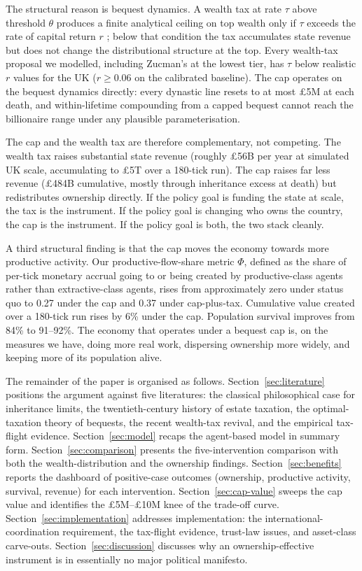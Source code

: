\documentclass[11pt]{article}
\begin{document}
The structural reason is bequest dynamics.  A wealth tax at rate
$\tau$ above threshold $\theta$ produces a finite analytical
ceiling on top wealth only if $\tau$ exceeds the rate of capital
return $r$ \citep{benhabib2011distribution}; below that
condition the tax accumulates state revenue but does not change
the distributional structure at the top.  Every wealth-tax proposal
we modelled, including Zucman's at the lowest tier, has $\tau$
below realistic $r$ values for the UK ($r \geq 0.06$ on the
calibrated baseline).  The cap operates on the bequest dynamics
directly: every dynastic line resets to at most \pounds 5M at
each death, and within-lifetime compounding from a capped bequest
cannot reach the billionaire range under any plausible
parameterisation.

The cap and the wealth tax are therefore complementary, not
competing.  The wealth tax raises substantial state revenue
(roughly \pounds 56B per year at simulated UK scale, accumulating
to \pounds 5T over a 180-tick run).  The cap raises far less
revenue (\pounds 484B cumulative, mostly through inheritance
excess at death) but redistributes ownership directly.  If the
policy goal is funding the state at scale, the tax is the
instrument.  If the policy goal is changing who owns the country,
the cap is the instrument.  If the policy goal is both, the two
stack cleanly.

A third structural finding is that the cap moves the economy
towards more productive activity.  Our productive-flow-share
metric $\Phi$, defined as the share of per-tick monetary accrual
going to or being created by productive-class agents rather than
extractive-class agents, rises from approximately zero under
status quo to 0.27 under the cap and 0.37 under cap-plus-tax.
Cumulative value created over a 180-tick run rises by 6\% under
the cap.  Population survival improves from 84\% to 91--92\%.
The economy that operates under a bequest cap is, on the measures
we have, doing more real work, dispersing ownership more widely,
and keeping more of its population alive.

The remainder of the paper is organised as follows.
Section~\ref{sec:literature} positions the argument against five
literatures: the classical philosophical case for inheritance
limits, the twentieth-century history of estate taxation, the
optimal-taxation theory of bequests, the recent wealth-tax
revival, and the empirical tax-flight evidence.
Section~\ref{sec:model} recaps the agent-based model in summary
form.  Section~\ref{sec:comparison} presents the five-intervention
comparison with both the wealth-distribution and the ownership
findings.  Section~\ref{sec:benefits} reports the dashboard of
positive-case outcomes (ownership, productive activity, survival,
revenue) for each intervention.  Section~\ref{sec:cap-value}
sweeps the cap value and identifies the \pounds 5M--\pounds 10M
knee of the trade-off curve.  Section~\ref{sec:implementation}
addresses implementation: the international-coordination
requirement, the tax-flight evidence, trust-law issues, and
asset-class carve-outs.  Section~\ref{sec:discussion} discusses
why an ownership-effective instrument is in essentially no major
political manifesto.
\end{document}
